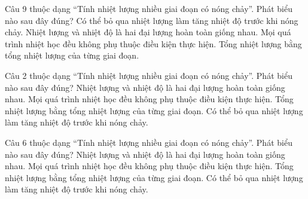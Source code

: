 
\begin{ex}
Câu 9 thuộc dạng “Tính nhiệt lượng nhiều giai đoạn có nóng chảy”. Phát biểu nào sau đây đúng?
\choice
{Có thể bỏ qua nhiệt lượng làm tăng nhiệt độ trước khi nóng chảy.}
{Nhiệt lượng và nhiệt độ là hai đại lượng hoàn toàn giống nhau.}
{Mọi quá trình nhiệt học đều không phụ thuộc điều kiện thực hiện.}
{\True Tổng nhiệt lượng bằng tổng nhiệt lượng của từng giai đoạn.}
\end{ex}


\begin{ex}
Câu 2 thuộc dạng “Tính nhiệt lượng nhiều giai đoạn có nóng chảy”. Phát biểu nào sau đây đúng?
\choice
{Nhiệt lượng và nhiệt độ là hai đại lượng hoàn toàn giống nhau.}
{Mọi quá trình nhiệt học đều không phụ thuộc điều kiện thực hiện.}
{\True Tổng nhiệt lượng bằng tổng nhiệt lượng của từng giai đoạn.}
{Có thể bỏ qua nhiệt lượng làm tăng nhiệt độ trước khi nóng chảy.}
\end{ex}


\begin{ex}
Câu 6 thuộc dạng “Tính nhiệt lượng nhiều giai đoạn có nóng chảy”. Phát biểu nào sau đây đúng?
\choice
{Nhiệt lượng và nhiệt độ là hai đại lượng hoàn toàn giống nhau.}
{Mọi quá trình nhiệt học đều không phụ thuộc điều kiện thực hiện.}
{\True Tổng nhiệt lượng bằng tổng nhiệt lượng của từng giai đoạn.}
{Có thể bỏ qua nhiệt lượng làm tăng nhiệt độ trước khi nóng chảy.}
\end{ex}

